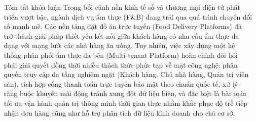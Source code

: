 \documentclass{uetgraduation}
\begin{document}
\begin{preamble}{Tóm tắt khóa luận}
Trong bối cảnh nền kinh tế số và thương mại điện tử phát triển vượt bậc, ngành dịch vụ ẩm thực (F\&B) đang trải qua quá trình chuyển đổi số mạnh mẽ. Các nền tảng đặt đồ ăn trực tuyến (Food Delivery Platforms) đã trở thành giải pháp thiết yếu kết nối giữa khách hàng có nhu cầu ẩm thực đa dạng với mạng lưới các nhà hàng ăn uống. Tuy nhiên, việc xây dựng một hệ thống phân phối ẩm thực đa bên (Multi-tenant Platform) hoàn chỉnh đòi hỏi phải giải quyết đồng thời nhiều thách thức phức tạp về mặt công nghệ: phân quyền truy cập đa tầng nghiêm ngặt (Khách hàng, Chủ nhà hàng, Quản trị viên sàn), tích hợp cổng thanh toán trực tuyến bảo mật theo chuẩn quốc tế, xử lý ràng buộc khuyến mãi động tránh xung đột dữ liệu biên, và đặc biệt là bài toán tối ưu vận hành quản trị thông minh thời gian thực nhằm khắc phục độ trễ tiếp nhận đơn hàng cũng như hỗ trợ phân tích dữ liệu kinh doanh cho chủ cơ sở.


\end{preamble}
\end{document}

